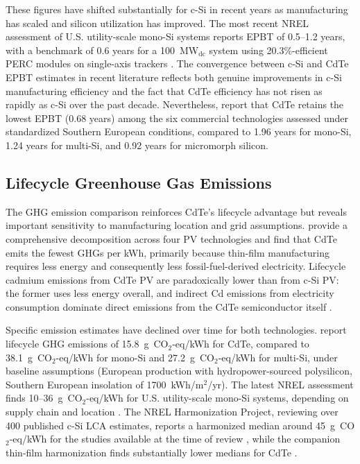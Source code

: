 \documentclass{article}
\begin{document}
These figures have shifted substantially for c-Si in recent years as manufacturing has scaled and silicon utilization has improved. The most recent NREL assessment of U.S. utility-scale mono-Si systems reports EPBT of 0.5--1.2 years, with a benchmark of 0.6 years for a 100~MW$_\text{dc}$ system using 20.3\%-efficient PERC modules on single-axis trackers \citep{smith2024nrel}. The convergence between c-Si and CdTe EPBT estimates in recent literature reflects both genuine improvements in c-Si manufacturing efficiency and the fact that CdTe efficiency has not risen as rapidly as c-Si over the past decade. Nevertheless, \citet{dewild2013} report that CdTe retains the lowest EPBT (0.68 years) among the six commercial technologies assessed under standardized Southern European conditions, compared to 1.96 years for mono-Si, 1.24 years for multi-Si, and 0.92 years for micromorph silicon.
 
\subsection{Lifecycle Greenhouse Gas Emissions}
 
The GHG emission comparison reinforces CdTe's lifecycle advantage but reveals important sensitivity to manufacturing location and grid assumptions. \citet{fthenakis2008} provide a comprehensive decomposition across four PV technologies and find that CdTe emits the fewest GHGs per kWh, primarily because thin-film manufacturing requires less energy and consequently less fossil-fuel-derived electricity. Lifecycle cadmium emissions from CdTe PV are paradoxically lower than from c-Si PV: the former uses less energy overall, and indirect Cd emissions from electricity consumption dominate direct emissions from the CdTe semiconductor itself \citep{fthenakis2008}.
 
Specific emission estimates have declined over time for both technologies. \citet{dewild2013} report lifecycle GHG emissions of 15.8~g~CO$_2$-eq/kWh for CdTe, compared to 38.1~g~CO$_2$-eq/kWh for mono-Si and 27.2~g~CO$_2$-eq/kWh for multi-Si, under baseline assumptions (European production with hydropower-sourced polysilicon, Southern European insolation of 1700~kWh/m$^2$/yr). The latest NREL assessment finds 10--36~g~CO$_2$-eq/kWh for U.S. utility-scale mono-Si systems, depending on supply chain and location \citep{smith2024nrel}. The NREL Harmonization Project, reviewing over 400 published c-Si LCA estimates, reports a harmonized median around 45~g~CO$_2$-eq/kWh for the studies available at the time of review \citep{hsu2012}, while the companion thin-film harmonization finds substantially lower medians for CdTe \citep{kim2012thinfilm}.
 
\end{document}
